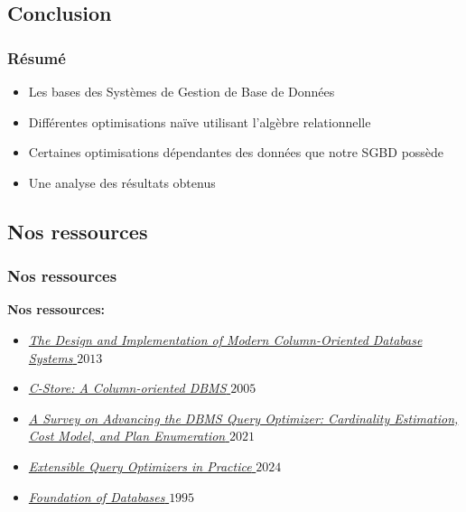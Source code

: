 \documentclass[a4paper,12pt]{beamer}
\begin{document}
\subsection{Conclusion}
\begin{frame}
    \frametitle{Résumé}
    \begin{itemize}
        \item Les bases des Systèmes de Gestion de Base de Données
        \item Différentes optimisations naïve utilisant l'algèbre relationnelle
        \item Certaines optimisations dépendantes des données que notre SGBD possède
        \item Une analyse des résultats obtenus
    \end{itemize}
\end{frame}

\subsection{Nos ressources}
\begin{frame}
    \frametitle{Nos ressources}
    \textbf{Nos ressources:}
    \begin{itemize}
        \item \href{https://drive.google.com/file/d/1KNmuRBf8CV-s-zqdkUEP8iyYlPgFiglb/view?usp=drive_link}{\textit{The Design and Implementation of Modern Column-Oriented Database Systems} \(2013\)}
        \item \href{https://web.stanford.edu/class/cs345d-01/rl/cstore.pdf}{\textit{C-Store: A Column-oriented DBMS} \(2005\)}
        \item \href{https://link.springer.com/content/pdf/10.1007/s41019-020-00149-7.pdf}{\textit{A Survey on Advancing the DBMS Query Optimizer: Cardinality Estimation, Cost Model, and Plan Enumeration} \(2021\)}
        \item \href{https://www.microsoft.com/en-us/research/wp-content/uploads/2024/12/Extensible-Query-Optimizers-in-Practice.pdf}{\textit{Extensible Query Optimizers in Practice} \(2024\)}
        \item \href{http://webdam.inria.fr/Alice/}{\textit{Foundation of Databases} \(1995\)}
    \end{itemize}
\end{frame}
\end{document}
